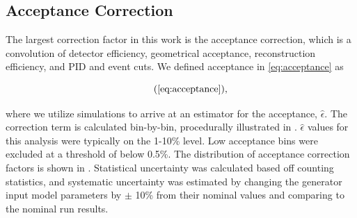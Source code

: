 \subsection{Acceptance Correction}
The largest correction factor in this work is the acceptance correction, which is a convolution of detector efficiency, geometrical acceptance, reconstruction efficiency, and PID and event cuts. We defined acceptance in \eqref{eq:acceptance} as

    \begin{equation*}
      \recallLabel{eq:acceptance},
    \end{equation*}

where we utilize simulations to arrive at an estimator for the acceptance, $\hat{\epsilon}$. The correction term is calculated bin-by-bin, procedurally illustrated in . $\hat{\epsilon}$ values for this analysis were typically on the 1-10\% level. Low acceptance bins were excluded at a threshold of below 0.5\%. The distribution of acceptance correction factors is shown in . Statistical uncertainty was calculated based off counting statistics, and systematic uncertainty was estimated by changing the generator input model parameters by $\pm$ 10\% from their nominal values and comparing to the nominal run results. 

